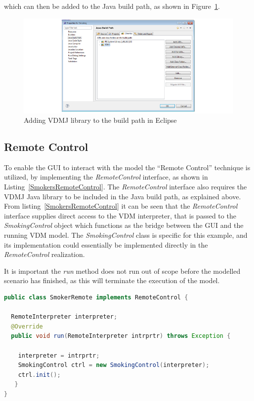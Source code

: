 \documentclass{overturerepchap}
\begin{document}
\noindent which can then be added to the Java build path, as shown in Figure~\ref{fig:gui:VDMJBuildPath}. 

\begin{figure}[h]
\begin{center}
  \includegraphics[width=\textwidth]{figures/SmokersVDMJBuildPath}
  \caption[labelInTOC]{Adding VDMJ library to the build path in Eclipse}
  \label{fig:gui:VDMJBuildPath}
\end{center}
\end{figure}

\newpage
\subsection{Remote Control}
To enable the GUI to interact with the model the ``Remote Control'' technique is utilized, by implementing the \textit{RemoteControl} interface, as shown in Listing~\ref{SmokersRemoteControl}. The \textit{RemoteControl} interface also requires the VDMJ Java library to be included in the Java build path, as explained above. From listing~\ref{SmokersRemoteControl} it can be seen that the \textit{RemoteControl} interface supplies direct access to the VDM interpreter, that is passed to the \textit{SmokingControl} object which functions as the bridge between the GUI and the running VDM model. The \textit{SmokingControl} class is specific for this example, and its implementation could essentially be implemented directly in the \textit{RemoteControl} realization. 

It is important the \textit{run} method does not run out of scope before the modelled scenario has finished, as this will terminate the execution of the model.  

\begin{lstlisting}[language=Java,label=SmokersRemoteControl,caption=Java implementation of the RemoteControl interface, captionpos=b]
public class SmokerRemote implements RemoteControl {

  RemoteInterpreter interpreter;
  @Override
  public void run(RemoteInterpreter intrprtr) throws Exception {
	
    interpreter = intrprtr;
    SmokingControl ctrl = new SmokingControl(interpreter);  
    ctrl.init();
   }
}
\end{lstlisting}
\end{document}
